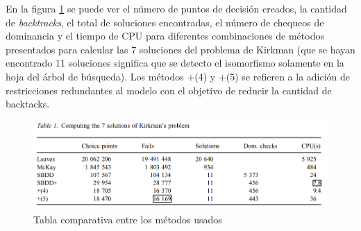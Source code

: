 \documentclass[letter, 10pt]{article}
\begin{document}
En la figura \ref{fig:table3kirkman} se puede ver el número de puntos de decisión creados, la cantidad de \textit{backtracks}, el total de soluciones encontradas, el número de chequeos de dominancia y el tiempo de CPU para diferentes combinaciones de métodos presentados para calcular las 7 soluciones del problema de Kirkman (que se hayan encontrado 11 soluciones significa que se detecto el isomorfismo solamente en la hoja del árbol de búsqueda). Los métodos +(4) y +(5) se refieren a la adición de restricciones redundantes al modelo con el objetivo de reducir la cantidad de backtacks. 

\begin{figure}[h]
    \centering
    \includegraphics[width=\textwidth]{figures/table3_sbdd.png}
    \caption{Tabla comparativa entre los métodos usados}
    \label{fig:table3kirkman}
\end{figure}
\end{document}
